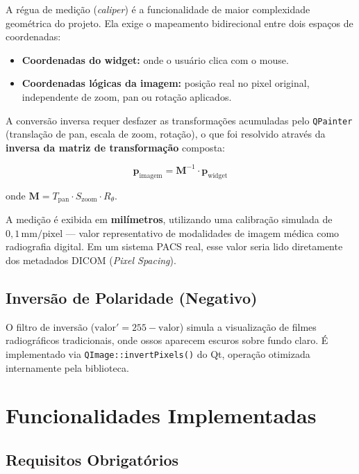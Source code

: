 \documentclass[12pt, a4paper]{article}
\begin{document}
A régua de medição (\textit{caliper}) é a funcionalidade de maior complexidade
geométrica do projeto. Ela exige o mapeamento bidirecional entre dois espaços
de coordenadas:

\begin{itemize}
  \item \textbf{Coordenadas do widget:} onde o usuário clica com o mouse.
  \item \textbf{Coordenadas lógicas da imagem:} posição real no pixel original,
        independente de zoom, pan ou rotação aplicados.
\end{itemize}

A conversão inversa requer desfazer as transformações acumuladas pelo
\texttt{QPainter} (translação de pan, escala de zoom, rotação), o que foi
resolvido através da \textbf{inversa da matriz de transformação} composta:

\begin{equation}
  \mathbf{p}_{\text{imagem}} = \mathbf{M}^{-1} \cdot \mathbf{p}_{\text{widget}}
\end{equation}

onde $\mathbf{M} = T_{\text{pan}} \cdot S_{\text{zoom}} \cdot R_{\theta}$.

A medição é exibida em \textbf{milímetros}, utilizando uma calibração simulada
de $0{,}1\,\text{mm/pixel}$ --- valor representativo de modalidades de imagem
médica como radiografia digital. Em um sistema PACS real, esse valor seria
lido diretamente dos metadados DICOM (\textit{Pixel Spacing}).

\subsection{Inversão de Polaridade (Negativo)}

O filtro de inversão ($\text{valor}' = 255 - \text{valor}$) simula a
visualização de filmes radiográficos tradicionais, onde ossos aparecem escuros
sobre fundo claro. É implementado via \texttt{QImage::invertPixels()} do Qt,
operação otimizada internamente pela biblioteca.

\section{Funcionalidades Implementadas}

\subsection{Requisitos Obrigatórios}
\end{document}
